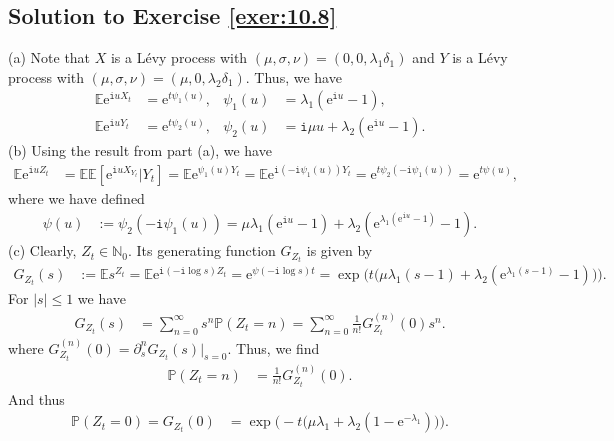 \documentclass[12pt]{book}
\numberwithin{equation}{chapter}
\theoremstyle{plain}
\numberwithin{theorem}{section}
\theoremstyle{definition}
\numberwithin{exercise}{chapter}
\newcommand{\<}{\langle}
\renewcommand{\>}{\rangle}
\renewcommand{\(}{\left(}
\renewcommand{\)}{\right)}
\renewcommand{\[}{\left[}
\renewcommand{\]}{\right]}
\newcommand\Eb{\mathds{E}}
\newcommand\Pb{\mathds{P}}
\newcommand\Nb{\mathds{N}}
\newcommand\sig{\sigma}
\newcommand\lam{\lambda}
\newcommand\del{\delta}
\renewcommand\d{\partial}
\newcommand\ii{\mathtt{i}}
\newcommand\ee{\mathrm{e}}
\begin{document}
\subsection*{Solution to Exercise \ref{exer:10.8}}
(a) Note that $X$ is a L\'evy process with $(\mu,\sig,\nu)=(0,0,\lam_1 \del_1)$ and 
$Y$ is a L\'evy process with $(\mu,\sig,\nu)=(\mu,0,\lam_2 \del_1)$.
Thus, we have
\begin{align}
\Eb \ee^{\ii u X_t}
	&=	\ee^{t \psi_1(u)}, &
\psi_1(u)
	&=	\lam_1 ( \ee^{\ii u} - 1 ) , \\
\Eb \ee^{\ii u Y_t}
	&=	\ee^{t \psi_2(u)} , &
\psi_2(u)
	&=	\ii \mu u + \lam_2 ( \ee^{\ii u} - 1 ) .
\end{align}
(b) Using the result from part (a), we have
\begin{align}
\Eb \ee^{\ii u Z_t}
	&=	\Eb \Eb[ \ee^{\ii u X_{Y_t}} | Y_t ]
	=		\Eb \ee^{\psi_1(u) Y_t}
	=		\Eb \ee^{\ii ( - \ii \psi_1(u) ) Y_t }
	=		\ee^{t \psi_2( - \ii \psi_1(u))} 
	=		\ee^{t \psi(u)} , 
\end{align}
where we have defined
\begin{align}
\psi(u)
	&:= \psi_2( - \ii \psi_1(u))
	=		\mu \lam_1 ( \ee^{\ii u} - 1 ) + \lam_2 ( \ee^{ \lam_1 ( \ee^{\ii u} - 1 )} - 1 ) .
\end{align}
(c)  Clearly, $Z_t \in \Nb_0$.  Its generating function $G_{Z_t}$ is given by
\begin{align}
G_{Z_t}(s)
	&:=	\Eb s^{Z_t}
	=		\Eb \ee^{\ii (-\ii \log s) Z_t}
	=		\ee^{\psi(- \ii \log s) t } 
	=		\exp \Big( t \big( \mu \lam_1 ( s - 1 ) + \lam_2 ( \ee^{ \lam_1 ( s - 1 )} - 1 ) \big) \Big) .
\end{align}
For $|s| \leq 1$ we have
\begin{align}
G_{Z_t}(s)
	&=	\sum_{n=0}^\infty s^n \Pb( Z_t = n )
	=		\sum_{n=0}^\infty \frac{1}{n!} G_{Z_t}^{(n)}(0) s^n .
\end{align}
where $G_{Z_t}^{(n)}(0) = \d_s^n G_{Z_t}(s) |_{s=0}$.  Thus, we find
\begin{align}
\Pb( Z_t = n )
	&=	\frac{1}{n!} G_{Z_t}^{(n)}(0) .
\end{align}
And thus
\begin{align}
\Pb(Z_t = 0) = G_{Z_t}(0)
	&=	\exp \Big(  - t \big( \mu \lam_1  + \lam_2 ( 1 - \ee^{ - \lam_1 } ) \big) \Big) .
\end{align}
\end{document}
